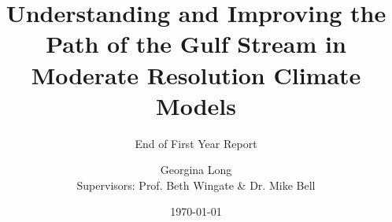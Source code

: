 \documentclass[a4paper,12pt]{article}
\title{Understanding and Improving the Path of the Gulf Stream in Moderate Resolution Climate Models}
\subtitle{End of First Year Report}
\author{Georgina Long \\ Supervisors: Prof. Beth Wingate \& Dr. Mike Bell}
\date{\mydate\today}
\begin{document}
\onehalfspacing
\maketitle











%








%



\end{document}
